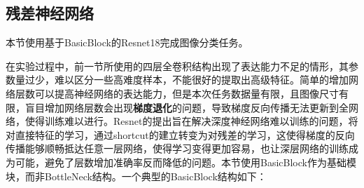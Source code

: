 \documentclass[UTF8]{ctexart}
\begin{document}
\subsection{残差神经网络}
本节使用基于BasicBlock的Resnet18完成图像分类任务。

在实验过程中，前一节所使用的四层全卷积结构出现了表达能力不足的情形，其参数量过少，难以区分一些高难度样本，不能很好的提取出高级特征。简单的增加网络层数可以提高神经网络的表达能力，但是本次任务数据量有限，且图像尺寸有限，盲目增加网络层数会出现\textbf{梯度退化}的问题，导致梯度反向传播无法更新到全网络，使得训练难以进行。Resnet的提出旨在解决深度神经网络难以训练的问题，将对直接特征的学习，通过shortcut的建立转变为对残差的学习，这使得梯度的反向传播能够顺畅抵达任意一层网络，使得学习变得更加容易，也让深层网络的训练成为可能，避免了层数增加准确率反而降低的问题。本节使用BasicBlock作为基础模块，而非BottleNeck结构。一个典型的BasicBlock结构如下：
\end{document}
